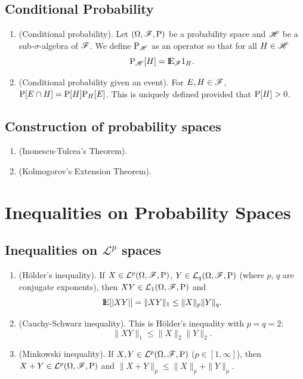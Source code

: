 \documentclass[a4paper,10pt]{article}
\begin{document}
\subsection{Conditional Probability}
\begin{enumerate}
 \item (Conditional probability). Let $(\Omega,\mathscr{F},\mathrm{P})$ be a probability space and $\mathscr{H}$ be a sub-$\sigma$-algebra
       of $\mathscr{F}$. We define $\mathrm{P}_{\mathscr{H}}$ as an operator so that for all $H\in\mathscr{H}$
       \[
        \prob_{\HH}[H] = \E_{\F}1_{H}.
       \]
 \item (Conditional probability given an event). For $E,H\in\mathscr{F}$, $\mathrm{P}[E\cap H] = \mathrm{P}[H]\mathrm{P}_{H}[E]$. This is
       uniquely defined provided that $\mathrm{P}[H]>0$.
\end{enumerate}

\subsection{Construction of probability spaces}
\begin{enumerate}
 \item (Inonescu-Tulcea's Theorem). 
 \item (Kolmogorov's Extension Theorem). 
\end{enumerate}



\section{Inequalities on Probability Spaces}

\subsection{Inequalities on $\mathcal{L}^p$ spaces}
\begin{enumerate}
  \item (H\"older's inequality). If $X\in\mathcal{L}^p(\Omega,\mathscr{F},\mathrm{P})$, $Y\in\mathcal{L}_q(\Omega,\mathscr{F},\mathrm{P})$ (where $p$, $q$ are conjugate exponents), then $XY\in\mathcal{L}_1(\Omega,\mathscr{F},\mathrm{P})$ and \[ \E[|XY|] = \|XY\|_1 \leq \|X\|_p \|Y\|_q.\]
 
 \item (Cauchy-Schwarz inequality). This is H\"older's inequality with $p=q=2$:
 \[
    \|XY\|_1 \leq \|X\|_2 \|Y\|_2.
 \]

 \item (Minkowski inequality). If $X,Y\in\mathcal{L}^p(\Omega,\mathscr{F},\mathrm{P})$ ($p\in [1,\infty]$), then $X+Y\in\mathcal{L}^p(\Omega,\mathscr{F},\mathrm{P})$  and 
       $\|X+Y\|_p \leq \|X\|_p + \|Y\|_p$.
\end{enumerate}
\end{document}
